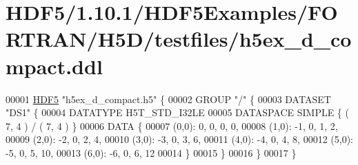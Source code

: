 \hypertarget{_h_d_f5_21_810_81_2_h_d_f5_examples_2_f_o_r_t_r_a_n_2_h5_d_2testfiles_2h5ex__d__compact_8ddl_source}{}\section{H\+D\+F5/1.10.1/\+H\+D\+F5\+Examples/\+F\+O\+R\+T\+R\+A\+N/\+H5\+D/testfiles/h5ex\+\_\+d\+\_\+compact.ddl}
\label{_h_d_f5_21_810_81_2_h_d_f5_examples_2_f_o_r_t_r_a_n_2_h5_d_2testfiles_2h5ex__d__compact_8ddl_source}

\begin{DoxyCode}
00001 \hyperlink{namespace_h_d_f5}{HDF5} \textcolor{stringliteral}{"h5ex\_d\_compact.h5"} \{
00002 GROUP \textcolor{stringliteral}{"/"} \{
00003    DATASET \textcolor{stringliteral}{"DS1"} \{
00004       DATATYPE  H5T\_STD\_I32LE
00005       DATASPACE  SIMPLE \{ ( 7, 4 ) / ( 7, 4 ) \}
00006       DATA \{
00007       (0,0): 0, 0, 0, 0,
00008       (1,0): -1, 0, 1, 2,
00009       (2,0): -2, 0, 2, 4,
00010       (3,0): -3, 0, 3, 6,
00011       (4,0): -4, 0, 4, 8,
00012       (5,0): -5, 0, 5, 10,
00013       (6,0): -6, 0, 6, 12
00014       \}
00015    \}
00016 \}
00017 \}
\end{DoxyCode}
